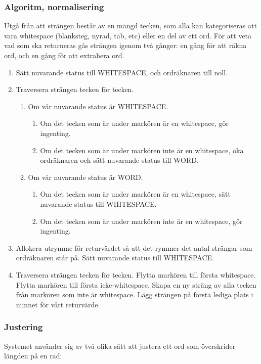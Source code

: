 \documentclass[a4paper,11pt]{article}
\begin{document}
\subsubsection{Algoritm, normalisering}
Utgå från att strängen består av en mängd tecken, som alla kan kategoriseras att vara whitespace (blanksteg, nyrad, tab, etc) eller en del av ett ord. För att veta vad som ska returneras gås strängen igenom två gånger: en gång för att räkna ord, och en gång för att extrahera ord.
	\begin{enumerate}
    	\item Sätt nuvarande status till WHITESPACE, och ordräknaren till noll.
    	\item Traversera strängen tecken för tecken.
    		\begin{enumerate}
        	\item Om vår nuvarande status är WHITESPACE.
        		\begin{enumerate}
            		\item Om det tecken som är under markören är en whitespace, gör ingenting.
            		\item Om det tecken som är under markören inte är en whitespace, öka ordräknaren och sätt nuvarande status till WORD.
            		\end{enumerate}
        	\item Om vår nuvarande status är WORD.
        		\begin{enumerate}
            		\item Om det tecken som är under markören är en whitespace, sätt nuvarande status till WHITESPACE.
            		\item Om det tecken som är under markören inte är en whitespace, gör ingenting.
            		\end{enumerate}
            	\end{enumerate}
    	\item Allokera utrymme för returvärdet så att det rymmer det antal strängar som ordräknaren står på. Sätt nuvarande status till WHITESPACE.
    	\item Traversera strängen tecken för tecken.
        Flytta markören till första whitespace.
        Flytta markören till första icke-whitespace.
        Skapa en ny sträng av alla tecken från markören som inte är whitespace. Lägg strängen på första lediga plats i minnet för vårt returvärde.
	\end{enumerate}
	
\subsubsection{Justering}
Systemet använder sig av två olika sätt att justera ett ord som överskrider längden på en rad:
\end{document}
